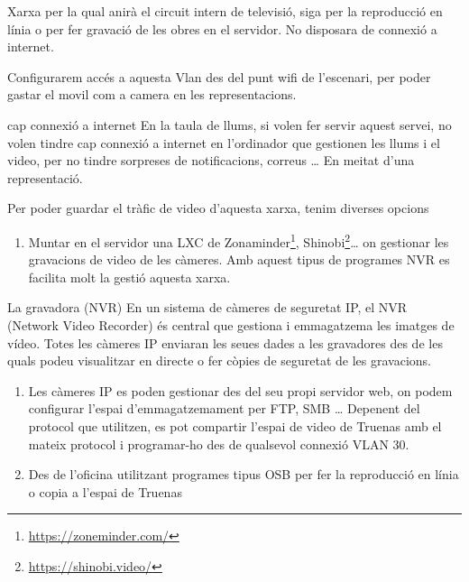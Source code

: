 \documentclass[
  10pt,
]{krantz}
\DeclareRobustCommand{\href}[2]{#2\footnote{\url{#1}}}
\providecommand{\tightlist}{%
  \setlength{\itemsep}{0pt}\setlength{\parskip}{0pt}}
\begin{document}
Xarxa per la qual anirà el circuit intern de televisió, siga per la reproducció en línia o per fer gravació de les obres en el servidor. No disposara de connexió a internet.

Configurarem accés a aquesta Vlan des del punt wifi de l'escenari, per poder gastar el movil com a camera en les representacions.

\begin{rmdcuidao}{cap connexió a internet}
En la taula de llums, si volen fer servir aquest servei, no volen tindre cap connexió a internet en l'ordinador que gestionen les llums i el video, per no tindre sorpreses de notificacions, correus \ldots{} En meitat d'una representació.

\end{rmdcuidao}

Per poder guardar el tràfic de video d'aquesta xarxa, tenim diverses opcions

\begin{enumerate}
\def\labelenumi{\arabic{enumi}.}
\tightlist
\item
  Muntar en el servidor una LXC de \href{https://zoneminder.com/}{Zonaminder}, \href{https://shinobi.video/}{Shinobi}\ldots{} on gestionar les gravacions de video de les càmeres. Amb aquest tipus de programes NVR es facilita molt la gestió aquesta xarxa.
\end{enumerate}

\begin{rmdinfo}{}
La gravadora (NVR) En un sistema de càmeres de seguretat IP, el NVR (Network Video Recorder) és central que gestiona i emmagatzema les imatges de vídeo. Totes les càmeres IP enviaran les seues dades a les gravadores des de les quals podeu visualitzar en directe o fer còpies de seguretat de les gravacions.

\end{rmdinfo}

\begin{enumerate}
\def\labelenumi{\arabic{enumi}.}
\setcounter{enumi}{1}
\item
  Les càmeres IP es poden gestionar des del seu propi servidor web, on podem configurar l'espai d'emmagatzemament per FTP, SMB \ldots{} Depenent del protocol que utilitzen, es pot compartir l'espai de video de Truenas amb el mateix protocol i programar-ho des de qualsevol connexió VLAN 30.
\item
  Des de l'oficina utilitzant programes tipus OSB per fer la reproducció en línia o copia a l'espai de Truenas
\end{enumerate}
\end{document}
